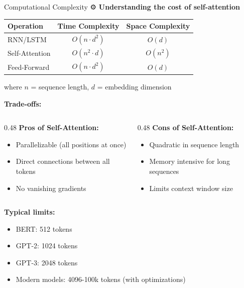 \documentclass[aspectratio=169]{beamer}
\begin{document}
\begin{frame}[shrink=10]{Computational Complexity ⚙️}
\textbf{Understanding the cost of self-attention}

\vspace{1em}

\begin{center}
\begin{tabular}{lcc}
\toprule
\textbf{Operation} & \textbf{Time Complexity} & \textbf{Space Complexity} \\
\midrule
RNN/LSTM & $O(n \cdot d^2)$ & $O(d)$ \\
Self-Attention & $O(n^2 \cdot d)$ & $O(n^2)$ \\
Feed-Forward & $O(n \cdot d^2)$ & $O(d)$ \\
\bottomrule
\end{tabular}

\vspace{0.5em}
\small
where $n$ = sequence length, $d$ = embedding dimension
\end{center}

\vspace{1em}

\textbf{Trade-offs:}
\begin{columns}[T]
\begin{column}{0.48\textwidth}
\textbf{Pros of Self-Attention:}
\begin{itemize}\setlength{\itemsep}{0pt}
    \item Parallelizable (all positions at once)
    \item Direct connections between all tokens
    \item No vanishing gradients
\end{itemize}
\end{column}

\begin{column}{0.48\textwidth}
\textbf{Cons of Self-Attention:}
\begin{itemize}\setlength{\itemsep}{0pt}
    \item Quadratic in sequence length
    \item Memory intensive for long sequences
    \item Limits context window size
\end{itemize}
\end{column}
\end{columns}

\vspace{1em}

\textbf{Typical limits:}
\begin{itemize}\setlength{\itemsep}{0pt}
    \item BERT: 512 tokens
    \item GPT-2: 1024 tokens
    \item GPT-3: 2048 tokens
    \item Modern models: 4096-100k tokens (with optimizations)
\end{itemize}
\end{frame}
\end{document}
